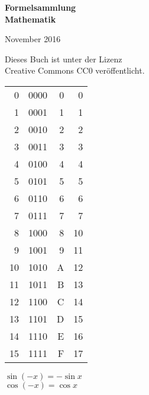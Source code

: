\documentclass[a4paper,10pt,fleqn,twocolumn,twoside,openany]{book}
\numberwithin{equation}{chapter}
\newenvironment{ttsection}{\ttfamily}{\par}
\begin{document}
\setlength{\abovedisplayskip}{6pt}
\setlength{\belowdisplayskip}{6pt}
\setlength{\abovedisplayshortskip}{6pt}
\setlength{\belowdisplayshortskip}{6pt}

\begin{titlepage}
\centering
\phantom{x}

\vspace{20em}
{\noindent\Huge\sffamily\textbf{Formelsammlung\\
Mathematik}}

\vspace{2em}
{\Large November 2016}\\
\end{titlepage}

\thispagestyle{empty}

\noindent
Dieses Buch ist unter der Lizenz\\
Creative Commons CC0 veröffentlicht.
\vspace{8em}

\noindent
\begin{ttsection}
\begin{tabular}{r|r|r|r}
 0 & 0000 & 0 &  0\\
 1 & 0001 & 1 &  1\\
 2 & 0010 & 2 &  2\\
 3 & 0011 & 3 &  3\\
\noalign{\vspace{1em}}
 4 & 0100 & 4 &  4\\
 5 & 0101 & 5 &  5\\
 6 & 0110 & 6 &  6\\
 7 & 0111 & 7 &  7\\
\noalign{\vspace{1em}}
 8 & 1000 & 8 & 10\\
 9 & 1001 & 9 & 11\\
10 & 1010 & A & 12\\
11 & 1011 & B & 13\\
\noalign{\vspace{1em}}
12 & 1100 & C & 14\\
13 & 1101 & D & 15\\
14 & 1110 & E & 16\\
15 & 1111 & F & 17
\end{tabular}
\end{ttsection}

\newpage
\noindent
$\sin(-x) = -\sin x$\\
$\cos(-x) = \cos x$
\vspace{1em}
\end{document}
